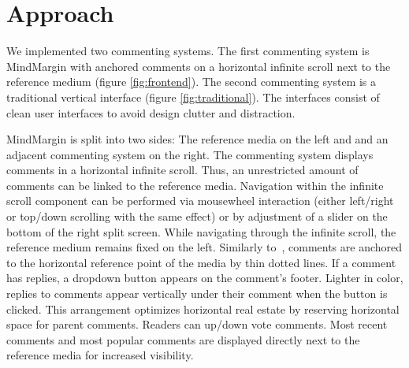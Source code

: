 \section {Approach}

We implemented two commenting systems. The first commenting system is MindMargin with anchored comments on a horizontal infinite scroll next to the reference medium (figure \ref{fig:frontend}). The second commenting system is a traditional vertical interface (figure \ref{fig:traditional}). The interfaces consist of clean user interfaces to avoid design clutter and distraction. 

MindMargin is split into two sides: The reference media on the left and and an adjacent commenting system on the right. The commenting system displays comments in a horizontal infinite scroll. Thus, an unrestricted amount of comments can be linked to the reference media. Navigation within the infinite scroll component can be performed via mousewheel interaction (either left/right or top/down scrolling with the same effect) or by adjustment of a slider on the bottom of the right split screen. While navigating through the infinite scroll, the reference medium remains fixed on the left. Similarly to~\cite{FluidDocs, NB}, comments are anchored to the horizontal reference point of the media by thin dotted lines. If a comment has replies, a dropdown button appears on the comment's footer. Lighter in color, replies to comments appear vertically under their comment when the button is clicked. This arrangement optimizes horizontal real estate by reserving horizontal space for parent comments.
Readers can up/down vote comments. Most recent comments and most popular comments are displayed directly next to the reference media for increased visibility.


